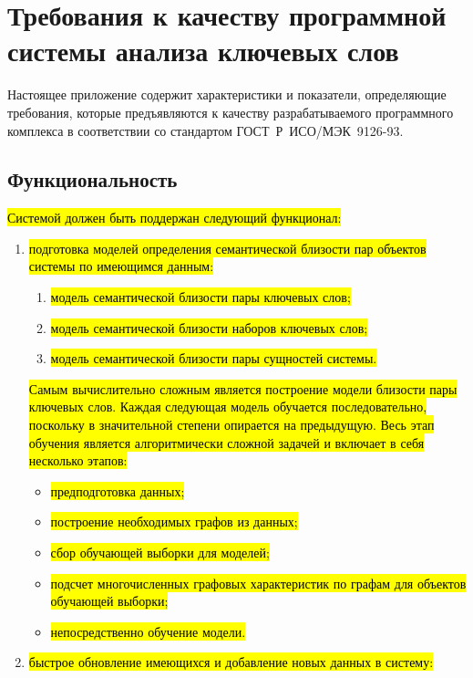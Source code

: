 \chapter{Требования к качеству программной системы анализа ключевых слов } \label{AppendixRequirements}
Настоящее приложение содержит характеристики и показатели, определяющие требования, которые предъявляются к качеству разрабатываемого программного комплекса в соответствии со стандартом \mbox{ГОСТ Р ИСО/МЭК 9126-93}.
\section{Функциональность}
\hl{Системой должен быть поддержан следующий функционал:}
\begin{enumerate}
    \item  \hl{подготовка моделей определения семантической близости пар объектов системы по имеющимся данным:}
    \begin{enumerate}
        \item  \hl{модель семантической близости пары ключевых слов;}
        \item  \hl{модель семантической близости наборов ключевых слов;}
        \item  \hl{модель семантической близости пары сущностей системы.}
    \end{enumerate}
    \hl{Самым вычислительно сложным является построение модели близости пары ключевых слов. Каждая следующая модель обучается последовательно, поскольку в значительной степени опирается на предыдущую. Весь этап обучения является алгоритмически сложной задачей и включает в себя несколько этапов:}
        \begin{itemize}
            \item \hl{предподготовка данных;}
            \item \hl{построение необходимых графов из данных;}
            \item \hl{сбор обучающей выборки для моделей;}
            \item \hl{подсчет многочисленных графовых характеристик по графам для объектов обучающей выборки;}
            \item \hl{непосредственно обучение модели.}
        \end{itemize}
    \item \hl{быстрое обновление имеющихся и добавление новых данных в систему:}
    \begin{enumerate}

\end{enumerate}
\end{enumerate}
